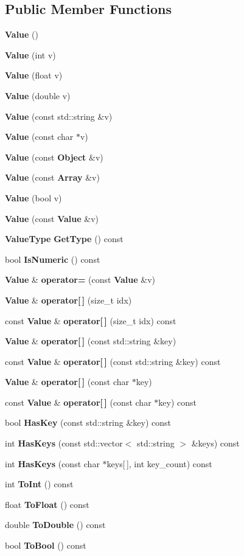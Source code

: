 \subsection*{Public Member Functions}
\begin{DoxyCompactItemize}
\item 
{\bf Value} ()
\item 
{\bf Value} (int v)
\item 
{\bf Value} (float v)
\item 
{\bf Value} (double v)
\item 
{\bf Value} (const std\+::string \&v)
\item 
{\bf Value} (const char $\ast$v)
\item 
{\bf Value} (const {\bf Object} \&v)
\item 
{\bf Value} (const {\bf Array} \&v)
\item 
{\bf Value} (bool v)
\item 
{\bf Value} (const {\bf Value} \&v)
\item 
{\bf Value\+Type} {\bf Get\+Type} () const 
\item 
bool {\bf Is\+Numeric} () const 
\item 
{\bf Value} \& {\bf operator=} (const {\bf Value} \&v)
\item 
{\bf Value} \& {\bf operator[$\,$]} (size\+\_\+t idx)
\item 
const {\bf Value} \& {\bf operator[$\,$]} (size\+\_\+t idx) const 
\item 
{\bf Value} \& {\bf operator[$\,$]} (const std\+::string \&key)
\item 
const {\bf Value} \& {\bf operator[$\,$]} (const std\+::string \&key) const 
\item 
{\bf Value} \& {\bf operator[$\,$]} (const char $\ast$key)
\item 
const {\bf Value} \& {\bf operator[$\,$]} (const char $\ast$key) const 
\item 
bool {\bf Has\+Key} (const std\+::string \&key) const 
\item 
int {\bf Has\+Keys} (const std\+::vector$<$ std\+::string $>$ \&keys) const 
\item 
int {\bf Has\+Keys} (const char $\ast$keys[$\,$], int key\+\_\+count) const 
\item 
int {\bf To\+Int} () const 
\item 
float {\bf To\+Float} () const 
\item 
double {\bf To\+Double} () const 
\item 
bool {\bf To\+Bool} () const 

\end{DoxyCompactItemize}
